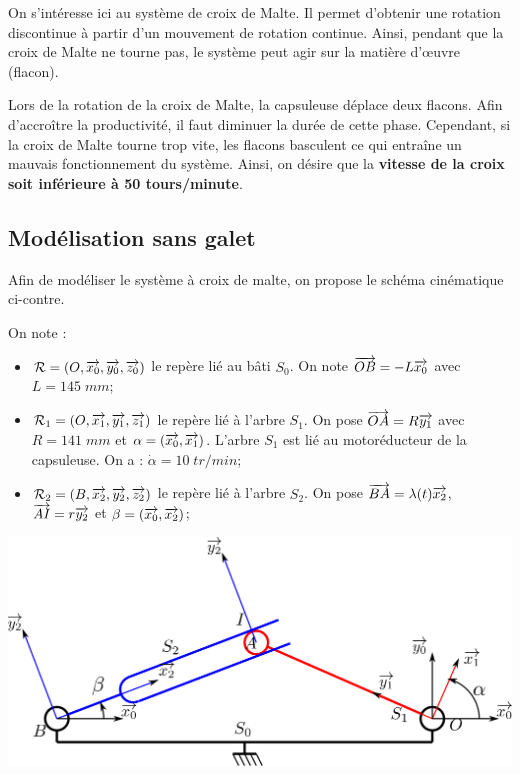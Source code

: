 \documentclass[10pt,oneside]{article}
\begin{document}
\vspace{.5cm}

On s'intéresse ici au système de croix de Malte. Il permet d'obtenir une rotation discontinue à partir d'un mouvement de rotation continue. Ainsi, pendant que la croix de Malte ne tourne pas, le système peut agir sur la matière d'\oe{}uvre (flacon).

Lors de la rotation de la croix de Malte, la capsuleuse déplace deux flacons. Afin d'accroître la productivité, il faut diminuer la durée de cette phase. Cependant, si la croix de Malte tourne trop vite, les flacons basculent ce qui entraîne un mauvais fonctionnement du système. Ainsi, on désire que la \textbf{vitesse de la croix soit inférieure à 50 tours/minute}. 



\subsection*{Modélisation sans galet}

\begin{minipage}[c]{.4\linewidth}
Afin de modéliser le système à croix de malte, on propose le schéma cinématique ci-contre. 


On note :
\begin{itemize}
\item $\mathcal{R}=\left( O,\overrightarrow{x_0},\overrightarrow{y_0},\overrightarrow{z_0}\right)$ le repère lié au bâti $S_0$. On note $\overrightarrow{OB}=-L\overrightarrow{x_0}$ avec $L = 145\; mm$;
\item $\mathcal{R}_1=\left( O,\overrightarrow{x_1},\overrightarrow{y_1},\overrightarrow{z_1}\right)$ le repère lié à l'arbre $S_1$. On pose $\overrightarrow{OA}=R\overrightarrow{y_1}$  avec $R =141\;mm$ et $\alpha = \left( \overrightarrow{x_0}, \overrightarrow{x_1}\right)$. L'arbre $S_1$ est lié au motoréducteur de la capsuleuse. On a : $\dot{\alpha} = 10\;tr/min$;
\item  $\mathcal{R}_2=\left( B,\overrightarrow{x_2},\overrightarrow{y_2},\overrightarrow{z_2}\right)$ le repère lié à l'arbre $S_2$. On pose $\overrightarrow{BA}=\lambda(t)\overrightarrow{x_2}$,  $\overrightarrow{AI}=r\overrightarrow{y_2}$ et $\beta = \left( \overrightarrow{x_0}, \overrightarrow{x_2}\right)$;
\end{itemize}


\end{minipage} \hfill
\begin{minipage}[c]{.55\linewidth}
\begin{center}
 \includegraphics[width=\textwidth]{png/schema1}
\end{center}
\end{minipage}
\end{document}
